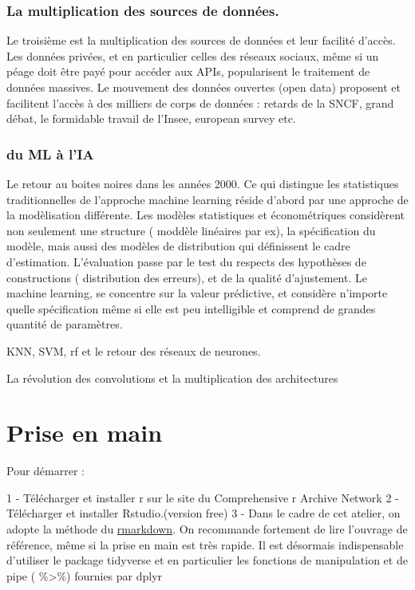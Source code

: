 \documentclass[
]{book}
\begin{document}
\hypertarget{la-multiplication-des-sources-de-donnuxe9es.}{%
\subsection{La multiplication des sources de données.}\label{la-multiplication-des-sources-de-donnuxe9es.}}

Le troisième est la multiplication des sources de données et leur facilité d'accès. Les données privées, et en particulier celles des réseaux sociaux, même si un péage doit être payé pour accéder aux APIs, popularisent le traitement de données massives. Le mouvement des données ouvertes (open data) proposent et facilitent l'accès à des milliers de corps de données : retards de la SNCF, grand débat, le formidable travail de l'Insee, european survey etc.

\hypertarget{du-ml-uxe0-lia}{%
\subsection{du ML à l'IA}\label{du-ml-uxe0-lia}}

Le retour au boites noires dans les années 2000. Ce qui distingue les statistiques traditionnelles de l'approche machine learning réside d'abord par une approche de la modèlisation différente. Les modèles statistiques et économétriques considèrent non seulement une structure ( moddèle linéaires par ex), la spécification du modèle, mais aussi des modèles de distribution qui définissent le cadre d'estimation. L'évaluation passe par le test du respects des hypothèses de constructions ( distribution des erreurs), et de la qualité d'ajustement. Le machine learning, se concentre sur la valeur prédictive, et considère n'importe quelle spécification même si elle est peu intelligible et comprend de grandes quantité de paramètres.

KNN, SVM, rf et le retour des réseaux de neurones.

La révolution des convolutions et la multiplication des architectures

\hypertarget{prise-en-main}{%
\chapter{Prise en main}\label{prise-en-main}}

Pour démarrer :

1 - Télécharger et installer r sur le site du Comprehensive r Archive Network
2 - Télécharger et installer Rstudio.(version free)
3 - Dans le cadre de cet atelier, on adopte la méthode du \href{https://rmarkdown.rstudio.com/lesson-1.html}{rmarkdown}. On recommande fortement de lire l'ouvrage de référence, même si la prise en main est très rapide. Il est désormais indispensable d'utiliser le package tidyverse et en particulier les fonctions de manipulation et de pipe ( \%\textgreater\%) fournies par dplyr
\end{document}
